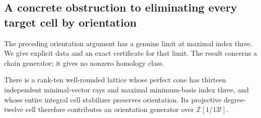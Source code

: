 \subsection{A concrete obstruction to eliminating every target cell by orientation}
\label{subsec:k12-survivor}

The preceding orientation argument has a genuine limit at maximal
index three. We give explicit data and an exact certificate for that
limit. The result concerns a chain generator; it gives no nonzero
homology class.

\begin{proposition}
\label{prop:k12-orientation-survivor}
There is a rank-ten well-rounded lattice whose perfect cone has
thirteen independent minimal-vector rays and maximal minimum-basis
index three, and whose entire integral cell stabilizer preserves
orientation. Its projective degree-twelve cell therefore contributes
an orientation generator over $\mathbb Z[1/13!]$.
\end{proposition}

